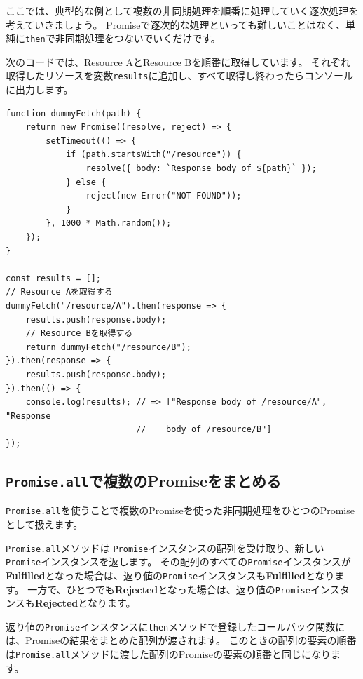 ここでは、典型的な例として複数の非同期処理を順番に処理していく逐次処理を考えていきましょう。
Promiseで逐次的な処理といっても難しいことはなく、単純に\texttt{then}で非同期処理をつないでいくだけです。

次のコードでは、Resource AとResource Bを順番に取得しています。
それぞれ取得したリソースを変数\texttt{results}に追加し、すべて取得し終わったらコンソールに出力します。

\begin{lstlisting}
function dummyFetch(path) {
    return new Promise((resolve, reject) => {
        setTimeout(() => {
            if (path.startsWith("/resource")) {
                resolve({ body: `Response body of ${path}` });
            } else {
                reject(new Error("NOT FOUND"));
            }
        }, 1000 * Math.random());
    });
}

const results = [];
// Resource Aを取得する
dummyFetch("/resource/A").then(response => {
    results.push(response.body);
    // Resource Bを取得する
    return dummyFetch("/resource/B");
}).then(response => {
    results.push(response.body);
}).then(() => {
    console.log(results); // => ["Response body of /resource/A", "Response 
                          //    body of /resource/B"]
});
\end{lstlisting}

\hypertarget{promise-all}{%
\subsection{\texorpdfstring{\texttt{Promise.all}で複数のPromiseをまとめる}{Promise.allで複数のPromiseをまとめる}}\label{promise-all}}

\texttt{Promise.all}を使うことで複数のPromiseを使った非同期処理をひとつのPromiseとして扱えます。

\texttt{Promise.all}メソッドは
\texttt{Promise}インスタンスの配列を受け取り、新しい\texttt{Promise}インスタンスを返します。
その配列のすべての\texttt{Promise}インスタンスが\textbf{Fulfilled}となった場合は、返り値の\texttt{Promise}インスタンスも\textbf{Fulfilled}となります。
一方で、ひとつでも\textbf{Rejected}となった場合は、返り値の\texttt{Promise}インスタンスも\textbf{Rejected}となります。

返り値の\texttt{Promise}インスタンスに\texttt{then}メソッドで登録したコールバック関数には、Promiseの結果をまとめた配列が渡されます。
このときの配列の要素の順番は\texttt{Promise.all}メソッドに渡した配列のPromiseの要素の順番と同じになります。

